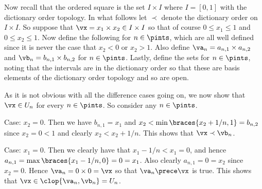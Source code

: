 {{    Now recall that the ordered square is the set $I \times I$ where $I = [0,1]$ with the dictionary order topology.
    In what follows let $\prec$ denote the dictionary order on $I \times I$.
    So suppose that $\vx = x_1 \times x_2 \in I \times I$ so that of course $0 \leq x_1 \leq 1$ and $0 \leq x_2 \leq 1$.
    Now define the following
    for $n \in \pints$, which are all well defined since it is never the case that $x_2 < 0$ or $x_2 > 1$.
    Also define $\va_n = a_{n,1} \times a_{n,2}$ and $\vb_n = b_{n,1} \times b_{n,2}$ for $n \in \pints$.
    Lastly, define the sets
    for $n \in \pints$, noting that the intervals are in the dictionary order so that these are basis elements of the dictionary order topology and so are open.

    As it is not obvious with all the difference cases going on, we now show that $\vx \in U_n$ for every $n \in \pints$.
    So consider any $n \in \pints$.

    Case: $x_2 = 0$.
    Then we have $b_{n,1} = x_1$ and $x_2 < \min\braces{x_2+1/n,1} = b_{n,2}$ since $x_2 = 0 < 1$ and clearly $x_2 < x_2+1/n$.
    This shows that $\vx \prec \vb_n$.
    \begin{indpar}
      Case: $x_1 = 0$.
      Then we clearly have that $x_1-1/n < x_1 = 0$, and hence $a_{n,1} = \max\braces{x_1-1/n,0} = 0 = x_1$.
      Also clearly $a_{n,1} = 0 = x_2$ since $x_2 = 0$.
      Hence $\va_n = 0 \times 0 = \vx$ so that $\va_n \prece \vx$ is true.
      This shows that $\vx \in \clop{\va_n,\vb_n} = U_n$.


\end{indpar}}}
